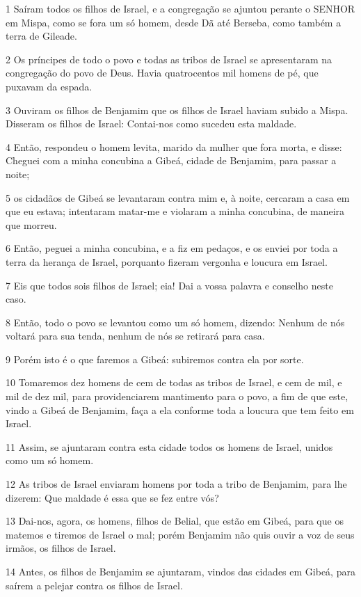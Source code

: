 \par 1 Saíram todos os filhos de Israel, e a congregação se ajuntou perante o SENHOR em Mispa, como se fora um só homem, desde Dã até Berseba, como também a terra de Gileade.
\par 2 Os príncipes de todo o povo e todas as tribos de Israel se apresentaram na congregação do povo de Deus. Havia quatrocentos mil homens de pé, que puxavam da espada.
\par 3 Ouviram os filhos de Benjamim que os filhos de Israel haviam subido a Mispa. Disseram os filhos de Israel: Contai-nos como sucedeu esta maldade.
\par 4 Então, respondeu o homem levita, marido da mulher que fora morta, e disse: Cheguei com a minha concubina a Gibeá, cidade de Benjamim, para passar a noite;
\par 5 os cidadãos de Gibeá se levantaram contra mim e, à noite, cercaram a casa em que eu estava; intentaram matar-me e violaram a minha concubina, de maneira que morreu.
\par 6 Então, peguei a minha concubina, e a fiz em pedaços, e os enviei por toda a terra da herança de Israel, porquanto fizeram vergonha e loucura em Israel.
\par 7 Eis que todos sois filhos de Israel; eia! Dai a vossa palavra e conselho neste caso.
\par 8 Então, todo o povo se levantou como um só homem, dizendo: Nenhum de nós voltará para sua tenda, nenhum de nós se retirará para casa.
\par 9 Porém isto é o que faremos a Gibeá: subiremos contra ela por sorte.
\par 10 Tomaremos dez homens de cem de todas as tribos de Israel, e cem de mil, e mil de dez mil, para providenciarem mantimento para o povo, a fim de que este, vindo a Gibeá de Benjamim, faça a ela conforme toda a loucura que tem feito em Israel.
\par 11 Assim, se ajuntaram contra esta cidade todos os homens de Israel, unidos como um só homem.
\par 12 As tribos de Israel enviaram homens por toda a tribo de Benjamim, para lhe dizerem: Que maldade é essa que se fez entre vós?
\par 13 Dai-nos, agora, os homens, filhos de Belial, que estão em Gibeá, para que os matemos e tiremos de Israel o mal; porém Benjamim não quis ouvir a voz de seus irmãos, os filhos de Israel.
\par 14 Antes, os filhos de Benjamim se ajuntaram, vindos das cidades em Gibeá, para saírem a pelejar contra os filhos de Israel.
